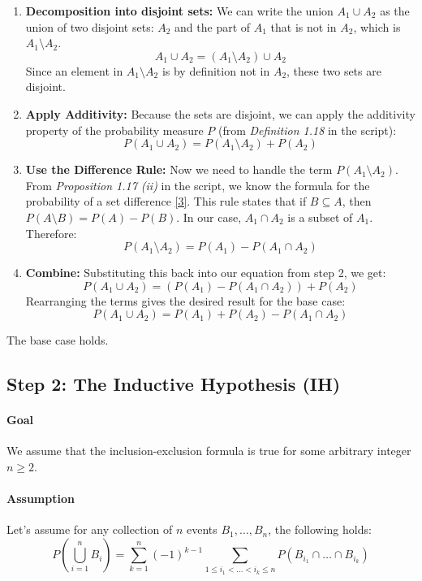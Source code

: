 \documentclass[11pt,a4paper]{article}
\begin{document}
\begin{enumerate}
    \item \textbf{Decomposition into disjoint sets:} We can write the union $A_1 \cup A_2$ as the union of two disjoint sets: $A_2$ and the part of $A_1$ that is not in $A_2$, which is $A_1 \setminus A_2$.
    $$ A_1 \cup A_2 = (A_1 \setminus A_2) \cup A_2 $$
    Since an element in $A_1 \setminus A_2$ is by definition not in $A_2$, these two sets are disjoint.

    \item \textbf{Apply Additivity:} Because the sets are disjoint, we can apply the additivity property of the probability measure $P$ (from \textit{Definition 1.18} in the script):
    $$ P(A_1 \cup A_2) = P(A_1 \setminus A_2) + P(A_2) $$

    \item \textbf{Use the Difference Rule:} Now we need to handle the term $P(A_1 \setminus A_2)$. From \textit{Proposition 1.17 (ii)} in the script, we know the formula for the probability of a set difference \hyperlink{note:difference}{[3]}. This rule states that if $B \subseteq A$, then $P(A \setminus B) = P(A) - P(B)$. In our case, $A_1 \cap A_2$ is a subset of $A_1$. Therefore:
    $$ P(A_1 \setminus A_2) = P(A_1) - P(A_1 \cap A_2) $$

    \item \textbf{Combine:} Substituting this back into our equation from step 2, we get:
    $$ P(A_1 \cup A_2) = \left( P(A_1) - P(A_1 \cap A_2) \right) + P(A_2) $$
    Rearranging the terms gives the desired result for the base case:
    $$ P(A_1 \cup A_2) = P(A_1) + P(A_2) - P(A_1 \cap A_2) $$
\end{enumerate}
The base case holds.

\subsection{Step 2: The Inductive Hypothesis (IH)}

\paragraph{Goal}
We assume that the inclusion-exclusion formula is true for some arbitrary integer $n \ge 2$.

\paragraph{Assumption}
Let's assume for any collection of $n$ events $B_1, \dots, B_n$, the following holds:
$$ P\left(\bigcup_{i=1}^n B_i\right) = \sum_{k=1}^n (-1)^{k-1} \sum_{1 \le i_1 < \dots < i_k \le n} P(B_{i_1} \cap \dots \cap B_{i_k}) $$
\end{document}

